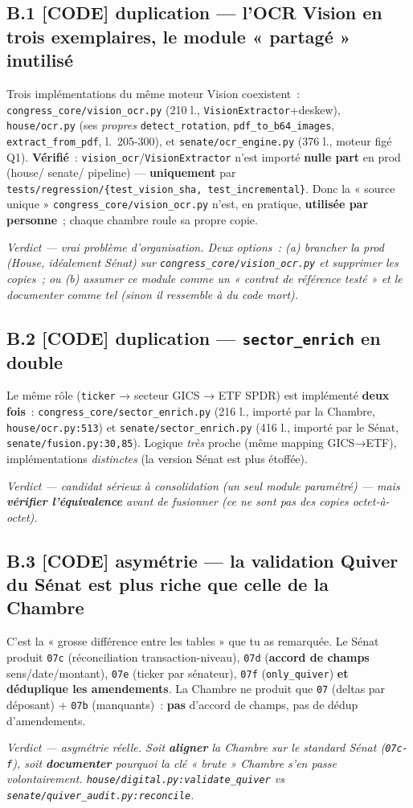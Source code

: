 \documentclass[11pt,a4paper]{article}
\newcommand{\co}[1]{\texttt{\small #1}}
\newcommand{\tagCode}{\textcolor{blue!70!black}{\textbf{[CODE]}}}
\newcommand{\verdict}[1]{\par\smallskip\noindent{\color{coreC}\rule{2pt}{\baselineskip}}\hspace{6pt}\textit{Verdict — #1}\par\smallskip}
\begin{document}
\subsection{B.1 \;\tagCode{} duplication — l'OCR Vision en \textbf{trois} exemplaires, le module « partagé » \textbf{inutilisé}}
Trois implémentations du même moteur Vision coexistent~: \co{congress_core/vision_ocr.py} (210 l.,
\co{VisionExtractor}+deskew), \co{house/ocr.py} (ses \emph{propres} \co{detect_rotation},
\co{pdf_to_b64_images}, \co{extract_from_pdf}, l.~205-300), et \co{senate/ocr_engine.py} (376 l., moteur
figé Q1). \textbf{Vérifié}~: \co{vision_ocr}/\co{VisionExtractor} n'est importé \textbf{nulle part} en
prod (house/ senate/ pipeline) — \textbf{uniquement} par \co{tests/regression/\{test_vision_sha,
test_incremental\}}. Donc la « source unique » \co{congress_core/vision_ocr.py} n'est, en pratique,
\textbf{utilisée par personne}~; chaque chambre roule sa propre copie.
\verdict{vrai problème d'organisation. Deux options~: (a) brancher la prod (House, idéalement Sénat) sur
\co{congress_core/vision_ocr.py} et supprimer les copies~; ou (b) assumer ce module comme un « contrat
de référence testé » et le \emph{documenter} comme tel (sinon il ressemble à du code mort).}

\subsection{B.2 \;\tagCode{} duplication — \co{sector_enrich} en double}
Le même rôle (\co{ticker} → secteur GICS → ETF SPDR) est implémenté \textbf{deux fois}~:
\co{congress_core/sector_enrich.py} (216 l., importé par la Chambre, \co{house/ocr.py:513}) et
\co{senate/sector_enrich.py} (416 l., importé par le Sénat, \co{senate/fusion.py:30,85}). Logique
\emph{très} proche (même mapping GICS→ETF), implémentations \emph{distinctes} (la version Sénat est plus
étoffée). \verdict{candidat sérieux à consolidation (un seul module paramétré) — mais \textbf{vérifier
l'équivalence} avant de fusionner (ce ne sont pas des copies octet-à-octet).}

\subsection{B.3 \;\tagCode{} asymétrie — la validation Quiver du Sénat est \textbf{plus riche} que celle de la Chambre}
C'est la « grosse différence entre les tables » que tu as remarquée. Le Sénat produit \co{07c}
(réconciliation transaction-niveau), \co{07d} (\textbf{accord de champs} sens/date/montant), \co{07e}
(ticker par sénateur), \co{07f} (\co{only_quiver}) \textbf{et déduplique les amendements}. La Chambre ne
produit que \co{07} (deltas par déposant) + \co{07b} (manquants)~: \textbf{pas} d'accord de champs, pas
de dédup d'amendements. \verdict{asymétrie réelle. Soit \textbf{aligner} la Chambre sur le standard
Sénat (\co{07c-f}), soit \textbf{documenter} pourquoi la clé « brute » Chambre s'en passe volontairement.
\co{house/digital.py:validate_quiver} vs \co{senate/quiver_audit.py:reconcile}.}
\end{document}
